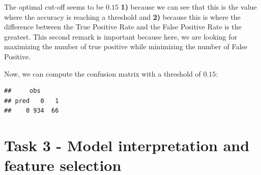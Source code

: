\documentclass[
  12pt,
  oneside]{report}
\begin{document}
The optimal cut-off seems to be \(0.15\) \textbf{1)} because we can see that this is the value where the accuracy is reaching a threshold and \textbf{2)} because this is where the difference between the True Positive Rate and the False Positive Rate is the greatest. This second remark is important because here, we are looking for maximizing the number of true positive while minimizing the number of False Positive.

Now, we can compute the confusion matrix with a threshold of \(0.15\):

\begin{verbatim}
##     obs
## pred   0   1
##    0 934  66
\end{verbatim}

\hypertarget{task-3---model-interpretation-and-feature-selection}{%
\chapter{Task 3 - Model interpretation and feature selection}\label{task-3---model-interpretation-and-feature-selection}}
\end{document}
